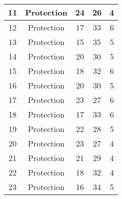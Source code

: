 \documentclass[results.tex]{subfiles}
\begin{document}
\begin{center}
\begin{tabular}{| c || c | c | c | c |}
            \hline
            11                      & Protection                   & 24                     & 26                      & 4                    \\
            \hline
            12                      & Protection                   & 17                     & 33                      & 6                    \\
            \hline
            13                      & Protection                   & 15                     & 35                      & 5                    \\
            \hline
            14                      & Protection                   & 20                     & 30                      & 5                    \\
            \hline
            15                      & Protection                   & 18                     & 32                      & 6                    \\
            \hline
            16                      & Protection                   & 20                     & 30                      & 5                    \\
            \hline
            17                      & Protection                   & 23                     & 27                      & 6                    \\
            \hline
            18                      & Protection                   & 17                     & 33                      & 6                    \\
            \hline
            19                      & Protection                   & 22                     & 28                      & 5                    \\
            \hline
            20                      & Protection                   & 23                     & 27                      & 4                    \\
            \hline
            21                      & Protection                   & 21                     & 29                      & 4                    \\
            \hline
            22                      & Protection                   & 18                     & 32                      & 4                    \\
            \hline
            23                      & Protection                   & 16                     & 34                      & 5                    \\

\end{tabular}
\end{center}
\end{document}
